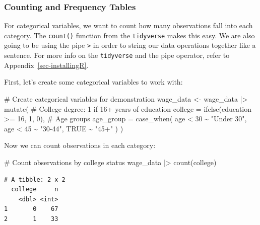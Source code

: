 \documentclass[
  letterpaper,
  DIV=11,
  numbers=noendperiod]{scrreprt}
\newenvironment{Shaded}{\begin{snugshade}}{\end{snugshade}}
\newcommand{\AttributeTok}[1]{\textcolor[rgb]{0.40,0.45,0.13}{#1}}
\newcommand{\CommentTok}[1]{\textcolor[rgb]{0.37,0.37,0.37}{#1}}
\newcommand{\ConstantTok}[1]{\textcolor[rgb]{0.56,0.35,0.01}{#1}}
\newcommand{\DecValTok}[1]{\textcolor[rgb]{0.68,0.00,0.00}{#1}}
\newcommand{\FunctionTok}[1]{\textcolor[rgb]{0.28,0.35,0.67}{#1}}
\newcommand{\NormalTok}[1]{\textcolor[rgb]{0.00,0.23,0.31}{#1}}
\newcommand{\OtherTok}[1]{\textcolor[rgb]{0.00,0.23,0.31}{#1}}
\newcommand{\SpecialCharTok}[1]{\textcolor[rgb]{0.37,0.37,0.37}{#1}}
\newcommand{\StringTok}[1]{\textcolor[rgb]{0.13,0.47,0.30}{#1}}
\begin{document}
\subsubsection{Counting and Frequency
Tables}\label{counting-and-frequency-tables}

For categorical variables, we want to count how many observations fall
into each category. The \texttt{count()} function from the
\texttt{tidyverse} makes this easy. We are also going to be using the
pipe \texttt{\textbar{}\textgreater{}} in order to string our data
operations together like a sentence. For more info on the
\texttt{tidyverse} and the pipe operator, refer to
Appendix~\ref{sec-installingR}.

First, let's create some categorical variables to work with:

\begin{Shaded}
\begin{Highlighting}[]
\CommentTok{\# Create categorical variables for demonstration}
\NormalTok{wage\_data }\OtherTok{\textless{}{-}}\NormalTok{ wage\_data }\SpecialCharTok{|\textgreater{}}
  \FunctionTok{mutate}\NormalTok{(}
    \CommentTok{\# College degree: 1 if 16+ years of education}
    \AttributeTok{college =} \FunctionTok{ifelse}\NormalTok{(education }\SpecialCharTok{\textgreater{}=} \DecValTok{16}\NormalTok{, }\DecValTok{1}\NormalTok{, }\DecValTok{0}\NormalTok{),}
    \CommentTok{\# Age groups}
    \AttributeTok{age\_group =} \FunctionTok{case\_when}\NormalTok{(}
\NormalTok{      age }\SpecialCharTok{\textless{}} \DecValTok{30} \SpecialCharTok{\textasciitilde{}} \StringTok{"Under 30"}\NormalTok{,}
\NormalTok{      age }\SpecialCharTok{\textless{}} \DecValTok{45} \SpecialCharTok{\textasciitilde{}} \StringTok{"30{-}44"}\NormalTok{,}
      \ConstantTok{TRUE} \SpecialCharTok{\textasciitilde{}} \StringTok{"45+"}
\NormalTok{    )}
\NormalTok{  )}
\end{Highlighting}
\end{Shaded}

Now we can count observations in each category:

\begin{Shaded}
\begin{Highlighting}[]
\CommentTok{\# Count observations by college status}
\NormalTok{wage\_data }\SpecialCharTok{|\textgreater{}}
  \FunctionTok{count}\NormalTok{(college)}
\end{Highlighting}
\end{Shaded}

\begin{verbatim}
# A tibble: 2 x 2
  college     n
    <dbl> <int>
1       0    67
2       1    33
\end{verbatim}
\end{document}
